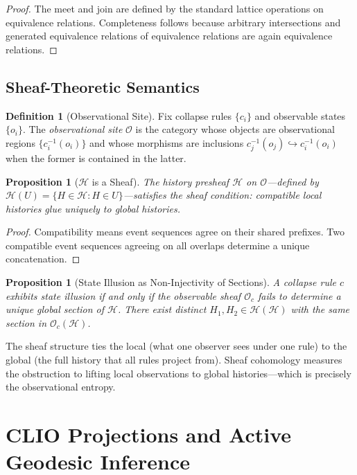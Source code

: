 \documentclass[12pt, a4paper, openany]{book}
\theoremstyle{plain}
\newtheorem{proposition}[theorem]{Proposition}
\theoremstyle{definition}
\newtheorem{definition}[theorem]{Definition}
\theoremstyle{remark}
\newcommand{\calH}{\mathcal{H}}
\begin{document}
\begin{proof}
The meet and join are defined by the standard lattice operations on equivalence
relations. Completeness follows because arbitrary intersections and generated
equivalence relations of equivalence relations are again equivalence relations.
\end{proof}

\section{Sheaf-Theoretic Semantics}

\begin{definition}[Observational Site]
Fix collapse rules $\{c_i\}$ and observable states $\{o_i\}$. The
\emph{observational site} $\mathcal{O}$ is the category whose objects are
observational regions $\{c_i^{-1}(o_i)\}$ and whose morphisms are inclusions
$c_j^{-1}(o_j) \hookrightarrow c_i^{-1}(o_i)$ when the former is contained in
the latter.
\end{definition}

\begin{proposition}[$\calH$ is a Sheaf]
The history presheaf $\calH$ on $\mathcal{O}$---defined by $\calH(U) = \{H \in \calH : H \in U\}$---satisfies the sheaf condition: compatible local histories glue
uniquely to global histories.
\end{proposition}

\begin{proof}
Compatibility means event sequences agree on their shared prefixes. Two compatible
event sequences agreeing on all overlaps determine a unique concatenation.
\end{proof}

\begin{proposition}[State Illusion as Non-Injectivity of Sections]
A collapse rule $c$ exhibits state illusion if and only if the observable sheaf
$\mathcal{O}_c$ fails to determine a unique global section of $\calH$. There
exist distinct $H_1, H_2 \in \calH(\calH)$ with the same section in
$\mathcal{O}_c(\calH)$.
\end{proposition}

The sheaf structure ties the local (what one observer sees under one rule) to the
global (the full history that all rules project from). Sheaf cohomology measures
the obstruction to lifting local observations to global histories---which is
precisely the observational entropy.

\chapter{CLIO Projections and Active Geodesic Inference}
\end{document}
